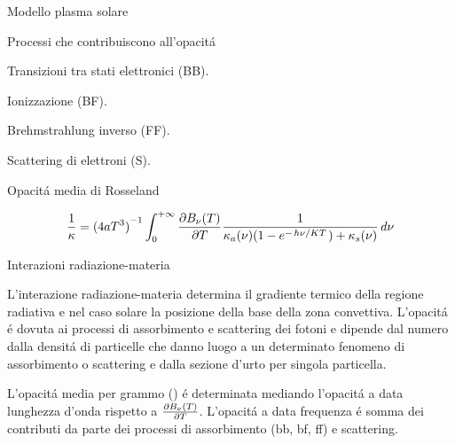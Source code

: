 \documentclass[10pt,xcolor={usenames},fleqn,mathserif,serif]{beamer}
\begin{document}
\begin{frame}{Modello plasma solare}

\begin{block}{Processi che contribuiscono all'opacit\'a}

Transizioni tra stati elettronici (BB).

Ionizzazione (BF).

Brehmstrahlung inverso (FF).

Scattering di elettroni (S).

\end{block}

\vfill

\begin{block}{Opacit\'a media di Rosseland}

\vfill

\begin{equation*}
\frac{1}{\kappa}=\invers{(4aT^3)}\int_0^{+\infty}\PDy{T}{B_{\nu}(T)}\frac{1}{\kappa_{a}(\nu)(1-\exp{-\midfrac{h\nu}{KT}})+\kappa_s(\nu)}\,d\nu
\end{equation*}

\end{block}

\vfill

\end{frame}

\begin{wordonframe}{Interazioni radiazione-materia}

L'interazione radiazione-materia determina il gradiente termico della regione radiativa e nel caso solare la posizione della base della zona convettiva. L'opacit\'a \'e dovuta ai processi di assorbimento e scattering dei fotoni e dipende dal numero dalla densit\'a di particelle che danno luogo a un determinato fenomeno di assorbimento o scattering e dalla sezione d'urto per singola particella.

L'opacit\'a media per grammo () \'e determinata mediando l'opacit\'a a data lunghezza d'onda rispetto a $\PDy{T}{B_{\nu}(T)}$. L'opacit\'a a data frequenza \'e somma dei contributi da parte dei processi di assorbimento (bb, bf, ff) e scattering.

\end{wordonframe}
\end{document}
